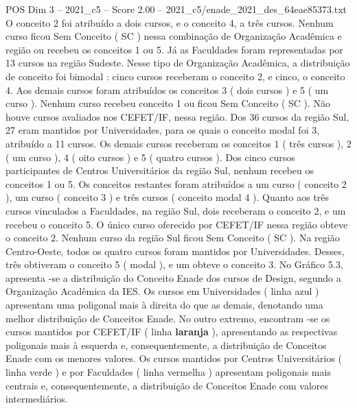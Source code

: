 \begin{textsample}{POS Dim 3 – 2021\_c5 – Score 2.00 – 2021\_c5/enade\_2021\_des\_64eae85373.txt}
O conceito 2 foi atribuído a dois cursos, e o conceito 4, a três cursos.
Nenhum curso ficou Sem Conceito ( SC ) nessa combinação de Organização Acadêmica e região ou recebeu os conceitos 1 ou 5.
Já as Faculdades foram representadas por 13 cursos na região Sudeste.
Nesse tipo de Organização Acadêmica, a distribuição de conceito foi bimodal : cinco cursos receberam o conceito 2, e cinco, o conceito 4.
Aos demais cursos foram atribuídos os conceitos 3 ( dois cursos ) e 5 ( um curso ).
Nenhum curso recebeu conceito 1 ou ficou Sem Conceito ( SC ).
Não houve cursos avaliados nos CEFET/IF, nessa região.
Dos 36 cursos da região Sul, 27 eram mantidos por Universidades, para os quais o conceito modal foi 3, atribuído a 11 cursos.
Os demais cursos receberam os conceitos 1 ( três cursos ), 2 ( um curso ), 4 ( oito cursos ) e 5 ( quatro cursos ).
Dos cinco cursos participantes de Centros Universitários da região Sul, nenhum recebeu os conceitos 1 ou 5.
Os conceitos restantes foram atribuídos a um curso ( conceito 2 ), um curso ( conceito 3 ) e três cursos ( conceito modal 4 ).
Quanto aos três cursos vinculados a Faculdades, na região Sul, dois receberam o conceito 2, e um recebeu o conceito 5.
O único curso oferecido por CEFET/IF nessa região obteve o conceito 2.
Nenhum curso da região Sul ficou Sem Conceito ( SC ).
Na região Centro-Oeste, todos os quatro cursos foram mantidos por Universidades.
Desses, três obtiveram o conceito 5 ( modal ), e um obteve o conceito 3.
No Gráfico 5.3, apresenta -se a distribuição do Conceito Enade dos cursos de Design, segundo a Organização Acadêmica da IES.
Os cursos em Universidades ( linha azul ) apresentam uma poligonal mais à direita do que as demais, denotando uma melhor distribuição de Conceitos Enade.
No outro extremo, encontram -se os cursos mantidos por CEFET/IF ( linha \textbf{laranja} ), apresentando as respectivas poligonais mais à esquerda e, consequentemente, a distribuição de Conceitos Enade com os menores valores.
Os cursos mantidos por Centros Universitários ( linha verde ) e por Faculdades ( linha vermelha ) apresentam poligonais mais centrais e, consequentemente, a distribuição de Conceitos Enade com valores intermediários.

\end{textsample}
